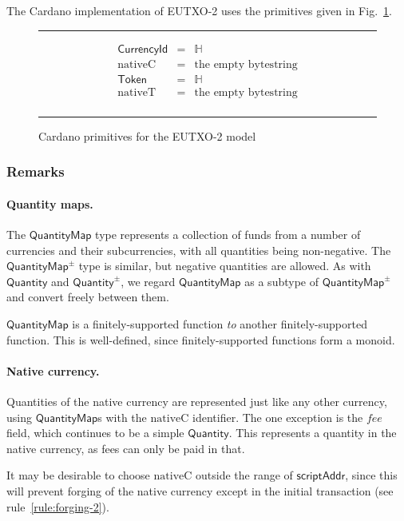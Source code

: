 \documentclass[a4paper]{article}
\newcommand{\s}{\textsf}  %
\newcommand{\msf}[1]{\ensuremath{\mathsf{#1}}}
\newcommand{\mi}[1]{\ensuremath{\mathit{#1}}}
\newcommand\rfskip{7pt}
\newenvironment{ruledfigure}[1]{\begin{figure}[#1]\hrule\vspace{\rfskip}}{\vspace{\rfskip}\hrule\end{figure}}
\newcommand{\scriptAddr}{\msf{scriptAddr}}
\newcommand{\fee}{\mi{fee}}
\newcommand{\qty}{\ensuremath{\s{Quantity}}}
\newcommand{\qtypm}{\ensuremath{\s{Quantity}^{\pm}}}
\newcommand{\token}{\ensuremath{\s{Token}}}
\newcommand{\currency}{\ensuremath{\s{CurrencyId}}}
\newcommand{\nativeCur}{\ensuremath{\mathrm{nativeC}}}
\newcommand{\nativeTok}{\ensuremath{\mathrm{nativeT}}}
\newcommand{\qtymap}{\ensuremath{\s{QuantityMap}}}
\newcommand{\qtymappm}{\ensuremath{\s{QuantityMap}^{\pm}}}
\renewcommand\H{\ensuremath{\mathbb{H}}}
\begin{document}
The Cardano implementation of EUTXO-2 uses the primitives given in
Fig.~\ref{fig:eutxo-2-types-cardano}.
\begin{ruledfigure}{H}
  \begin{displaymath}
    \begin{array}{rll}
      \currency  &=& \H\\
      \nativeCur &=& \mbox{the empty bytestring}\\
      \token     &=& \H\\
      \nativeTok &=& \mbox{the empty bytestring}\\
    \end{array}
  \end{displaymath}
  \caption{Cardano primitives for the EUTXO-2 model}
  \label{fig:eutxo-2-types-cardano}
\end{ruledfigure}

\subsubsection{Remarks}
\paragraph{Quantity maps. }
The \qtymap{} type represents a collection of funds from a
number of currencies and their subcurrencies, with all quantities
being non-negative.  The \qtymappm{} type is similar, but
negative quantities are allowed.  As with \qty{} and \qtypm{}, we regard
\qtymap{} as a subtype of \qtymappm{} and convert freely between them.

\qtymap{} is a finitely-supported function \emph{to} another finitely-supported
function. This is well-defined, since finitely-supported functions form a monoid.

\paragraph{Native currency. }
Quantities of the native currency are represented just like any other currency,
using \qtymap{}s with the \nativeCur{} identifier. The one exception is the
\fee{} field, which continues to be a simple \qty{}. This represents a quantity
in the native currency, as fees can only be paid in that.

It may be desirable to choose \nativeCur{} outside the range
of \scriptAddr{}, since this will prevent forging of the native currency
except in the initial transaction (see rule~\ref{rule:forging-2}).
\end{document}
